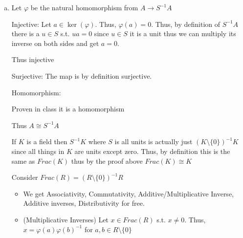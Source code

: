 \documentclass[12pt, letterpaper]{article}
\newcommand{\Q}{\mathbb{Q}}
\newcommand{\Z}{\mathbb{Z}}
\begin{document}
\begin{enumerate}[(a)]
    Therefore,
    \[\Z[X] \diagup (2X-1) \cong \{1,2,4,\dots\}^{-1}\Z=A\]
    
    Let $\varphi: A \to \Q$ s.t. $\varphi(a/2k)=a/2k$

    Injective: This is clearly injective since $a/2k = b/2m$ in $\Q$ then $a2m=b2k \implies 1(a2m-b2k)=0$ which satisfies the equivalence relation in $A$.

    Surjective:

    Let $a/b \in \Q$ then $a/b=2a/2b$. Since $2b \in \{1,2,4,\dots\}$, we get that $2a/2b \in A$. Thus $\varphi(2a/2b)=a/b$.

    Homomorphism:

    $\varphi(a/b)\varphi(c/d)=(a/b)(c/d)=ac/bd=ac/bd=\varphi(ac/bc)$

    $\varphi(a/b)+\varphi(c/d)=(ad+cb)/bd=\varphi((ad+cb)/bd)=\varphi(a/b+c/d)$

    $\varphi(1/1)=1/1$

    Thus $A \cong \Q$

    \[(\Z \diagup 6 \Z)[X] \diagup(2X-1) \cong \{1,2,4\}^{-1}(\Z \diagup 6\Z) \cong \Z \diagup 3\Z\]
    We showed the last part in class

    \item Let $\varphi$ be the natural homomorphism from $A \to S^{-1}A$
    
    Injective: Let $a \in \ker(\varphi)$. Thus, $\varphi(a)=0$. Thus, by definition of $S^{-1}A$ there is a $u \in S$ s.t. $ua=0$ since $u \in S$ it is a unit thus we can multiply its inverse on both sides and get $a=0$.

    Thus injective

    Surjective: The map is by definition surjective.

    Homomorphism:

    Proven in class it is a homomorphism

    Thus $A \cong S^{-1}A$

    If $K$ is a field then $S^{-1}K$ where $S$ is all units is actually just $(K\setminus \{0\})^{-1}K$ since all things in $K$ are units except zero. Thus, by definition this is the same as $Frac(K)$ thus by the proof above $Frac(K) \cong K$

    Consider $Frac(R)=(R \setminus \{0\})^{-1}R$

    \begin{itemize}
        \item We get Associativity, Commutativity, Additive/Multiplicative Inverse, Additive inverses, Distributivity for free.
        \item (Multiplicative Inverses) Let $x \in Frac(R)$ s.t. $x \neq 0$. Thus, $x=\varphi(a)\varphi(b)^{-1}$ for $a,b \in R \setminus \{0\}$
        

\end{itemize}
\end{enumerate}
\end{document}
